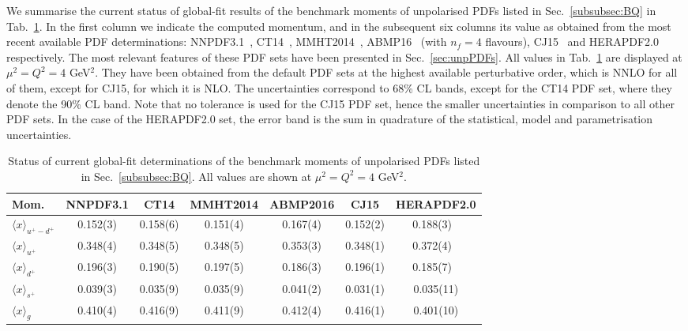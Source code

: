 We summarise the current status of global-fit results of the benchmark
moments of unpolarised PDFs listed in Sec.~\ref{subsubsec:BQ} 
in Tab.~\ref{tab:unpPDFmoms}.
%
In the first column we indicate the computed momentum, and in the subsequent 
six columns its value as obtained from the most recent available PDF 
determinations: NNPDF3.1~\cite{Ball:2017nwa},
CT14~\cite{Dulat:2015mca}, MMHT2014~\cite{Harland-Lang:2014zoa},
ABMP16~\cite{Alekhin:2017kpj} (with $n_f=4$ flavours), 
CJ15~\cite{Accardi:2016qay} and 
HERAPDF2.0~\cite{Abramowicz:2015mha} respectively.
%
The most relevant features of these PDF sets have been presented in 
Sec.~\ref{sec:unpPDFs}.
%
All values in Tab.~\ref{tab:unpPDFmoms} are displayed
at $\mu^2=Q^2=4$ GeV$^2$. 
%
They have been obtained from the default PDF sets at the highest available 
perturbative order, which is NNLO for all of them, except for CJ15, 
for which it is NLO.
%
The uncertainties correspond to 68\% CL bands, except for the CT14 PDF set,
where they denote the 90\% CL band.
%
Note that no tolerance is used for the CJ15 PDF set, hence the 
smaller uncertainties in comparison to all other PDF sets.
%
In the case of the HERAPDF2.0 set, the error band is the sum in quadrature 
of the statistical, model and parametrisation uncertainties.

\begin{table}[!t]
\centering
\renewcommand{\arraystretch}{1.2}
\begin{tabular}{lcccccc}
\toprule
Mom. 
& NNPDF3.1 & CT14 & MMHT2014 & ABMP2016 & CJ15 & HERAPDF2.0 \\
\midrule
$\langle x \rangle_{u^+-d^+}$ 
& 0.152(3) & 0.158(6) & 0.151(4) & 0.167(4) & 0.152(2) & 0.188(3)\ \,\\
$\langle x \rangle_{u^+}$    
& 0.348(4) & 0.348(5) & 0.348(5) & 0.353(3) & 0.348(1) & 0.372(4)\ \,\\
$\langle x \rangle_{d^+}$    
& 0.196(3) & 0.190(5) & 0.197(5) & 0.186(3) & 0.196(1) & 0.185(7)\ \,\\
$\langle x \rangle_{s^+}$    
& 0.039(3) & 0.035(9) & 0.035(9) & 0.041(2) & 0.031(1) & 0.035(11)\\
$\langle x \rangle_{g}$     
& 0.410(4) & 0.416(9) & 0.411(9) & 0.412(4) & 0.416(1) & 0.401(10)\\
\bottomrule
\end{tabular}
\caption{\small Status of current global-fit determinations of the 
benchmark moments of unpolarised PDFs listed in Sec.~\ref{subsubsec:BQ}.
All values are shown at $\mu^2=Q^2=4$ GeV$^2$.}
\label{tab:unpPDFmoms}
\end{table}

